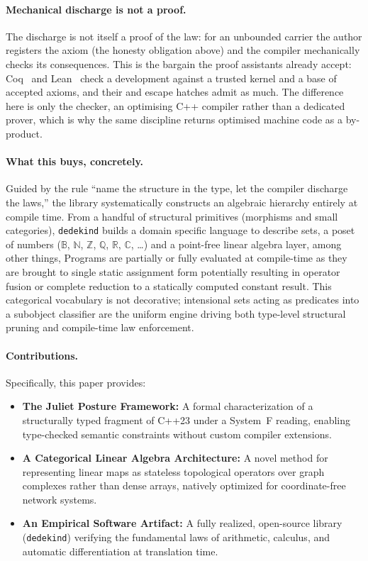 \documentclass[11pt, a4paper]{article}
\begin{document}
\paragraph{Mechanical discharge is not a proof.}
The discharge is not itself a proof of the law: for an unbounded carrier the author registers the axiom (the honesty obligation above) and the compiler mechanically checks its consequences.
This is the bargain the proof assistants already accept: Coq~\cite{Coq} and Lean~\cite{Moura2015Lean} check a development against a trusted kernel and a base of accepted axioms, and their  and  escape hatches admit as much.
The difference here is only the checker, an optimising C++ compiler rather than a dedicated prover, which is why the same discipline returns optimised machine code as a by-product.

\paragraph{What this buys, concretely.}
Guided by the rule ``name the structure in the type, let the compiler discharge the laws,'' the library systematically constructs an algebraic hierarchy entirely at compile time.
From a handful of structural primitives (morphisms and small categories), \texttt{dedekind} builds a domain specific language to describe sets, a poset of numbers ($\mathbb{B}$, $\mathbb{N}$, $\mathbb{Z}$, $\mathbb{Q}$, $\mathbb{R}$, $\mathbb{C}$, \ldots) and a point-free linear algebra layer, among other things,
Programs are partially or fully evaluated at compile-time as they are brought to single static assignment form potentially resulting in operator fusion or complete reduction to a statically computed constant result.
This categorical vocabulary is not decorative; intensional sets acting as predicates into a subobject classifier are the uniform engine driving both type-level structural pruning and compile-time law enforcement.

\paragraph{Contributions.} Specifically, this paper provides:
\begin{itemize} 
\item \textbf{The Juliet Posture Framework:} A formal characterization of a structurally typed fragment of C++23 under a System~F reading, enabling type-checked semantic constraints without custom compiler extensions.
\item \textbf{A Categorical Linear Algebra Architecture:} A novel method for representing linear maps as stateless topological operators over graph complexes rather than dense arrays, natively optimized for coordinate-free network systems.
\item \textbf{An Empirical Software Artifact:} A fully realized, open-source library (\texttt{dedekind}) verifying the fundamental laws of arithmetic, calculus, and automatic differentiation at translation time.
\end{itemize}
\end{document}
